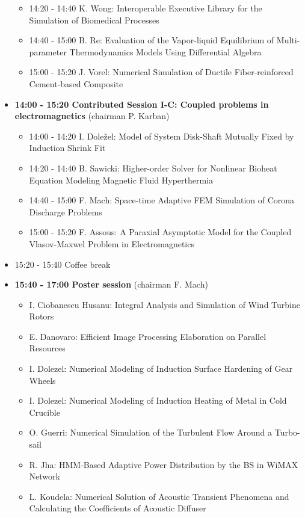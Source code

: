 \documentclass[10pt]{article}%
\begin{document}
\begin{itemize}
\begin{itemize}
    \item 14:20 - 14:40 {K. Wong}: {Interoperable Executive Library for the Simulation of Biomedical Processes}
    \item 14:40 - 15:00 {B. Re}: {Evaluation of the Vapor-liquid Equilibrium of Multi-parameter Thermodynamics Models Using Differential Algebra}
    \item 15:00 - 15:20 {J. Vorel}: {Numerical Simulation of Ductile Fiber-reinforced Cement-based Composite}
  \end{itemize}
    \item {\bf 14:00 - 15:20 Contributed Session I-C: Coupled problems in electromagnetics} (chairman P. Karban) 
  \begin{itemize}
    \item 14:00 - 14:20 {I. Doležel}: {Model of System Disk-Shaft Mutually Fixed by Induction Shrink Fit}
    \item 14:20 - 14:40 {B. Sawicki}: {Higher-order Solver for Nonlinear Bioheat Equation Modeling Magnetic Fluid Hyperthermia}
    \item 14:40 - 15:00 {F. Mach}: {Space-time Adaptive FEM Simulation of Corona Discharge Problems}
    \item 15:00 - 15:20 {F. Assous}: {A Paraxial Asymptotic Model for the Coupled Vlasov-Maxwel Problem in Electromagnetics}  %
    \end{itemize}
  \item 15:20 - 15:40 Coffee break
  \newpage
  \item {\bf 15:40 - 17:00 Poster session} (chairman F. Mach)
  \begin{itemize}
    \item {I. Ciobanescu Husanu}: {Integral Analysis and Simulation of Wind Turbine Rotors}
    \item {E. Danovaro}: {Efficient Image Processing Elaboration on Parallel Resources}
    \item {I. Dolezel}: {Numerical Modeling of Induction Surface Hardening of Gear Wheels}
    \item {I. Dolezel}: {Numerical Modeling of Induction Heating of Metal in Cold Crucible}
    \item {O. Guerri}: {Numerical Simulation of the Turbulent Flow Around a Turbo-sail}
    \item {R. Jha}: {HMM-Based Adaptive Power Distribution by the BS in WiMAX Network}
    \item {L. Koudela}: {Numerical Solution of Acoustic Transient Phenomena and Calculating the Coefficients of Acoustic Diffuser}

\end{itemize}
\end{itemize}
\end{document}
